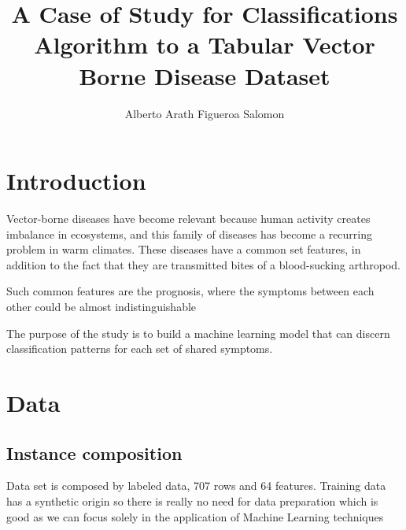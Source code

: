 \documentclass{article}
\title{A Case of Study for Classifications Algorithm to a Tabular Vector Borne Disease Dataset}
\author{Alberto Arath Figueroa Salomon}
\begin{document}
\maketitle

\section{Introduction}

Vector-borne diseases have become relevant because human activity
creates imbalance in ecosystems, and this family of diseases has become a recurring problem in warm climates. These diseases have a common set features, in addition to the fact that they are transmitted bites of a blood-sucking arthropod.

Such common features are the prognosis, where the symptoms between each other could be almost indistinguishable 

The purpose of the study is to build a machine learning model that can discern classification patterns for each set of shared symptoms.

\section{Data}

\subsection{Instance composition}
Data set is composed by labeled data, 707 rows and 64 features.
Training data has a synthetic origin so there is really no need for data preparation
which is good as we can focus solely in the application of Machine Learning techniques


\begin{table}[h!] %
\centering
\renewcommand{\arraystretch}{1.2} %
\caption{Sample training set with a subset of features.}
\label{tab:sample_training}
\end{table}
\end{document}
